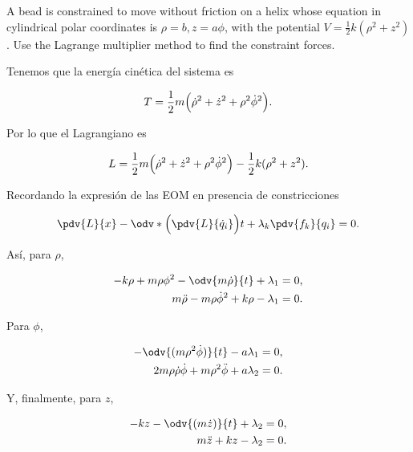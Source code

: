 \documentclass[../main.tex]{subfiles}
\begin{document}
\begin{problema}
	A bead is constrained to move without friction on a helix whose equation
	in cylindrical polar coordinates is \(\rho = b, z = a\phi\), with
	the potential \( V = \tfrac{1}{2}k(\rho^{2} + z^{2})\). Use the
	Lagrange multiplier method to find the constraint forces.

	\startsolution

	Tenemos que la energía cinética del sistema es

	\begin{equation*}
		T = \dfrac{1}{2}m \Bigl(\dot{\rho}^{2} + \dot{z}^{2} + \rho^{2}\dot{\phi}^{2}\Bigr).
	\end{equation*}

	Por lo que el Lagrangiano es

	\begin{equation*}
		L = \dfrac{1}{2}m \Bigl(\dot{\rho}^{2} + \dot{z}^{2} + \rho^{2}\dot{\phi}^{2}\Bigr) - \dfrac{1}{2}k(\rho^{2} + z^{2}).
	\end{equation*}

	Recordando la expresión de las EOM en presencia de constricciones

	\begin{equation*}
		\pdv{L}{x} - \odv*{\Bigl(\pdv{L}{\dot{q}_{i}}\Bigr)}{t} + \lambda_{k}\pdv{f_{k}}{q_{i}} = 0.
	\end{equation*}

	Así, para \(\rho\),

	\begin{align}
		-k\rho + m\rho \phi^{2} - \odv{m\dot{\rho}}{t} + \lambda_{1} & = 0,\nonumber \\
		m \ddot{\rho} - m\rho \dot{\phi}^{2} + k\rho - \lambda_{1}   & = 0.
		\label{eq:eom-rho}
	\end{align}

	Para \(\phi\),

	\begin{align}
		-\odv{(m\rho^{2} \dot{\phi})}{t} - a\lambda_{1}                     & = 0,\nonumber \\
		2m\rho \dot{\rho} \dot{\phi} + m\rho^{2} \ddot{\phi} + a\lambda_{2} & = 0.
		\label{eq:eom-phi}
	\end{align}

	Y, finalmente, para \(z\),

	\begin{align}
		-kz - \odv{(m \dot{z})}{t} + \lambda_{2} & = 0,\nonumber \\
		m \ddot{z} + kz - \lambda_{2}            & = 0.
		\label{eq:eom-z}
	\end{align}


\end{problema}
\end{document}
